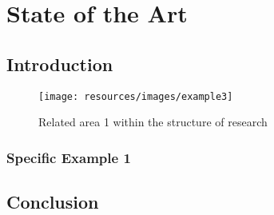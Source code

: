 \cleardoublepage\chapter{State of the Art}\label{sec:sota}

\section{Introduction}


\begin{figure}[H]
    \centering
    \texttt{[image: resources/images/example3]}
    \caption{Related area 1 within the structure of research}\label{fig:hourglass:ra1}
\end{figure}


\subsection{Specific Example 1}

\section{Conclusion}



